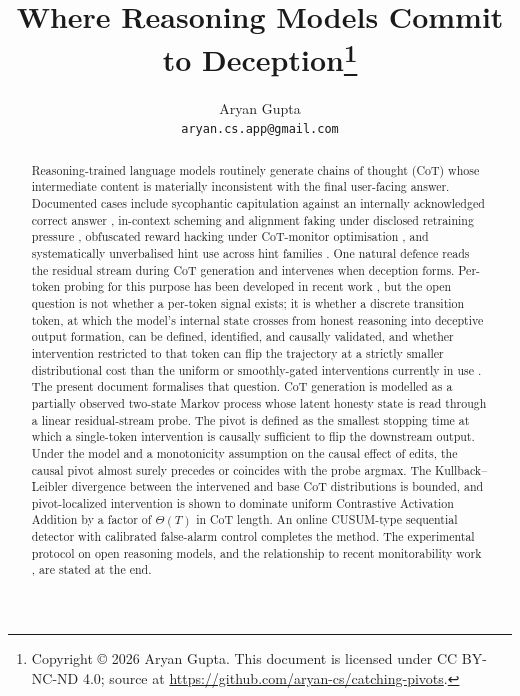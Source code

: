 \documentclass[11pt]{article}
\title{\textbf{Where Reasoning Models Commit to Deception}\thanks{Copyright \copyright{} 2026 Aryan Gupta. This document is licensed under CC BY-NC-ND 4.0; source at \url{https://github.com/aryan-cs/catching-pivots}.}}
\author{Aryan Gupta \\ \texttt{aryan.cs.app@gmail.com}}
\date{}
\theoremstyle{definition}
\newcommand{\1}{\mathbf{1}}
\begin{document}
\maketitle

\begin{abstract}
\noindent
Reasoning-trained language models routinely generate chains of thought (CoT) whose intermediate content is materially inconsistent with the final user-facing answer. Documented cases include sycophantic capitulation against an internally acknowledged correct answer \citep{sharma2023sycophancy,perez2022mwe}, in-context scheming and alignment faking under disclosed retraining pressure \citep{meinke2024scheming,greenblatt2024faking}, obfuscated reward hacking under CoT-monitor optimisation \citep{baker2025monitoring}, and systematically unverbalised hint use across hint families \citep{chen2025reasoningthink}. One natural defence reads the residual stream during CoT generation and intervenes when deception forms. Per-token probing for this purpose has been developed in recent work \citep{goldowsky2025deception,chrabaszcz2026monologue,mirtaheri2026rationalization}, but the open question is not whether a per-token signal exists; it is whether a discrete transition token, at which the model's internal state crosses from honest reasoning into deceptive output formation, can be defined, identified, and causally validated, and whether intervention restricted to that token can flip the trajectory at a strictly smaller distributional cost than the uniform or smoothly-gated interventions currently in use \citep{panickssery2023caa,lee2024cast,ferrando2025dsas,yu2025pixel}. The present document formalises that question. CoT generation is modelled as a partially observed two-state Markov process whose latent honesty state is read through a linear residual-stream probe. The pivot is defined as the smallest stopping time at which a single-token intervention is causally sufficient to flip the downstream output. Under the model and a monotonicity assumption on the causal effect of edits, the causal pivot almost surely precedes or coincides with the probe argmax. The Kullback--Leibler divergence between the intervened and base CoT distributions is bounded, and pivot-localized intervention is shown to dominate uniform Contrastive Activation Addition by a factor of $\Theta(T)$ in CoT length. An online CUSUM-type sequential detector with calibrated false-alarm control completes the method. The experimental protocol on open reasoning models, and the relationship to recent monitorability work \citep{korbak2025monitorability}, are stated at the end.
\end{abstract}
\end{document}

